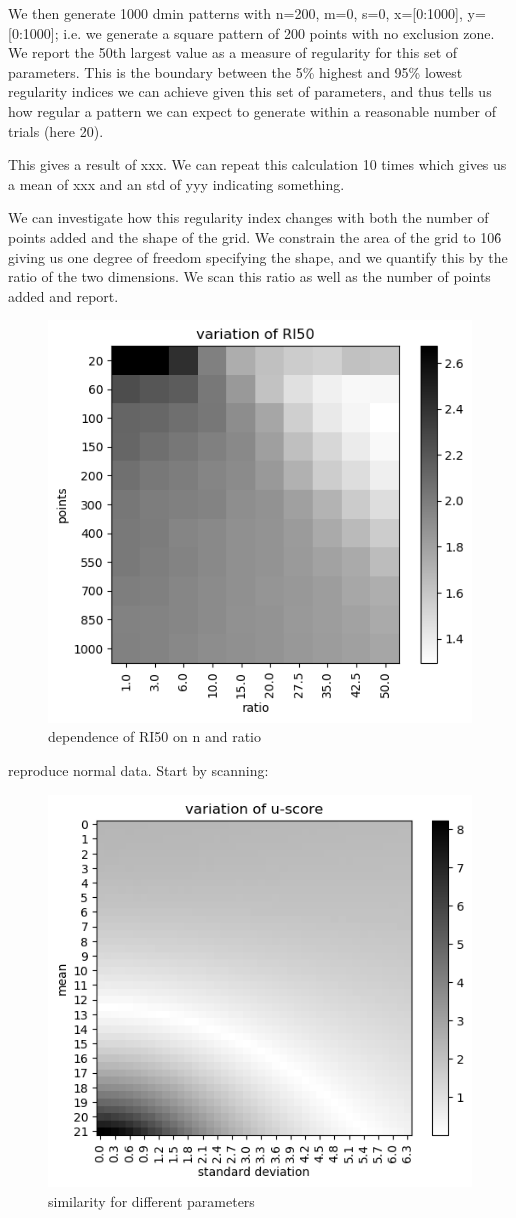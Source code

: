 \documentclass{article}
\begin{document}
We then generate 1000 dmin patterns with n=200, m=0, s=0, x=[0:1000], y=[0:1000]; i.e. we generate a square pattern of 200 points with no exclusion zone. We report the 50th largest value as a measure of regularity for this set of parameters. This is the boundary between the 5\% highest and 95\% lowest regularity indices we can achieve given this set of parameters, and thus tells us how regular a pattern we can expect to generate within a reasonable number of trials (here 20).

This gives a result of xxx. We can repeat this calculation 10 times which gives us a mean of xxx and an std of yyy indicating something.

We can investigate how this regularity index changes with both the number of points added and the shape of the grid. We constrain the area of the grid to 10\^6 giving us one degree of freedom specifying the shape, and we quantify this by the ratio of the two dimensions. We scan this ratio as well as the number of points added and report.

\begin{figure}[h]
\centering
\includegraphics[width = 0.5\linewidth, trim={0 0 0 0}, clip=true]{RI50s_gray.png}
\caption{dependence of RI50 on n and ratio}
\label{fig:RI50}
\end{figure}

reproduce normal data. Start by scanning:

\begin{figure}[h]
\centering
\includegraphics[width = 0.5\linewidth, trim={0 0 0 0}, clip=true]{similarity_gray_good.png}
\caption{similarity for different parameters}
\label{fig:sim}
\end{figure}
\end{document}
